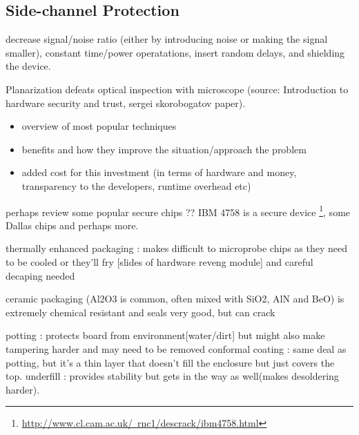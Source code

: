 \subsection{Side-channel Protection}
decrease signal/noise ratio (either by introducing noise or making the signal smaller), constant time/power operatations, insert random delays\citep{sergei:thesis}, \citep{kocher:DPA} and shielding the device.

Planarization defeats optical inspection with microscope (source: Introduction to hardware security and trust, sergei skorobogatov paper).\\
	\begin{itemize}
	\item overview of most popular techniques \\
	\item benefits and how they improve the situation/approach the problem
	\item added cost for this investment (in terms of hardware and money, transparency to the developers, runtime overhead etc)\\
	\end{itemize}
	
	perhaps review some popular secure chips ?? IBM 4758 is a secure device \footnote{\href{http://www.cl.cam.ac.uk/~rnc1/descrack/ibm4758.html}{http://www.cl.cam.ac.uk/~rnc1/descrack/ibm4758.html}}, some Dallas chips and perhaps more.
	
	thermally enhanced packaging : makes difficult to microprobe chips as they need to be cooled or they'll fry [slides of hardware reveng module] and careful decaping needed
	
	ceramic packaging (Al2O3 is common, often mixed with SiO2, AlN and BeO) is extremely chemical resistant and seals very good, but can crack
	
	potting : protects board from environment[water/dirt] but might also make tampering harder and may need to be removed
	conformal coating : same deal as potting, but it's a thin layer that doesn't fill the enclosure but just covers the top.
	underfill : provides stability but gets in the way as well(makes desoldering harder).